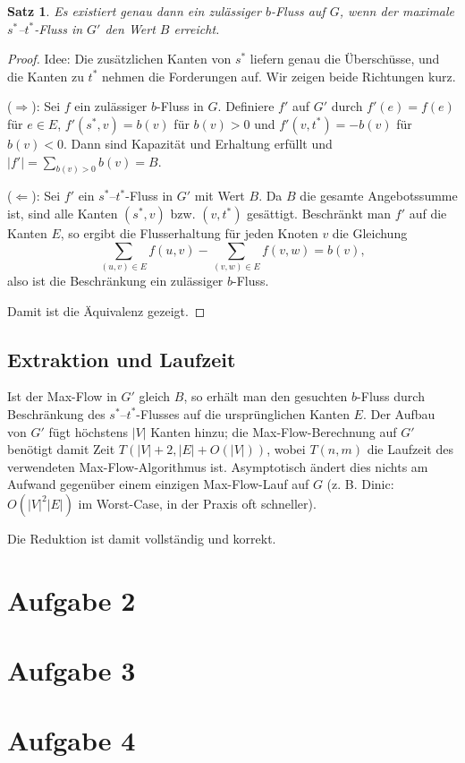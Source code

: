 \documentclass[a4paper]{scrartcl}
\newtheorem{satz}{Satz}
\begin{document}
\begin{satz}
Es existiert genau dann ein zulässiger $b$-Fluss auf $G$, wenn der maximale $s^*$--$t^*$-Fluss in $G'$ den Wert $B$ erreicht.
\end{satz}
\begin{proof}

Idee: Die zusätzlichen Kanten von $s^*$ liefern genau die Überschüsse, und die Kanten zu $t^*$ nehmen die Forderungen auf. Wir zeigen beide Richtungen kurz.

($\Rightarrow$): Sei $f$ ein zulässiger $b$-Fluss in $G$. Definiere $f'$ auf $G'$ durch $f'(e)=f(e)$ für $e\in E$, $f'(s^*,v)=b(v)$ für $b(v)>0$ und $f'(v,t^*)=-b(v)$ für $b(v)<0$. Dann sind Kapazität und Erhaltung erfüllt und $|f'|=\sum_{b(v)>0}b(v)=B$.

($\Leftarrow$): Sei $f'$ ein $s^*$--$t^*$-Fluss in $G'$ mit Wert $B$. Da $B$ die gesamte Angebotssumme ist, sind alle Kanten $(s^*,v)$ bzw. $(v,t^*)$ gesättigt. Beschränkt man $f'$ auf die Kanten $E$, so ergibt die Flusserhaltung für jeden Knoten $v$ die Gleichung
\[\sum_{(u,v)\in E} f(u,v)-\sum_{(v,w)\in E} f(v,w)=b(v),\]
also ist die Beschränkung ein zulässiger $b$-Fluss.

Damit ist die Äquivalenz gezeigt.
\end{proof}

\subsection*{Extraktion und Laufzeit}
Ist der Max-Flow in $G'$ gleich $B$, so erhält man den gesuchten $b$-Fluss durch Beschränkung des $s^*$--$t^*$-Flusses auf die ursprünglichen Kanten $E$.
Der Aufbau von $G'$ fügt höchstens $|V|$ Kanten hinzu; die Max-Flow-Berechnung auf $G'$ benötigt damit Zeit $T(|V|+2,|E|+O(|V|))$,
wobei $T(n,m)$ die Laufzeit des verwendeten Max-Flow-Algorithmus ist. Asymptotisch ändert dies nichts am Aufwand gegenüber einem
einzigen Max-Flow-Lauf auf $G$ (z. B. Dinic: $O(|V|^2|E|)$ im Worst-Case, in der Praxis oft schneller).

\medskip
Die Reduktion ist damit vollständig und korrekt.

\section*{Aufgabe 2}

\section*{Aufgabe 3}

\section*{Aufgabe 4}


\end{document}
